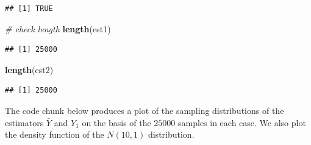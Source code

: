 \documentclass[]{book}
\newenvironment{Shaded}{\begin{snugshade}}{\end{snugshade}}
\newcommand{\KeywordTok}[1]{\textcolor[rgb]{0.13,0.29,0.53}{\textbf{#1}}}
\newcommand{\CommentTok}[1]{\textcolor[rgb]{0.56,0.35,0.01}{\textit{#1}}}
\newcommand{\NormalTok}[1]{#1}
\theoremstyle{definition}
\theoremstyle{definition}
\theoremstyle{definition}
\theoremstyle{remark}
\begin{document}
\begin{verbatim}
## [1] TRUE
\end{verbatim}

\begin{Shaded}
\begin{Highlighting}[]
\CommentTok{# check length}
\KeywordTok{length}\NormalTok{(est1)}
\end{Highlighting}
\end{Shaded}

\begin{verbatim}
## [1] 25000
\end{verbatim}

\begin{Shaded}
\begin{Highlighting}[]
\KeywordTok{length}\NormalTok{(est2)}
\end{Highlighting}
\end{Shaded}

\begin{verbatim}
## [1] 25000
\end{verbatim}

The code chunk below produces a plot of the sampling distributions of
the estimators \(\bar{Y}\) and \(Y_1\) on the basis of the \(25000\)
samples in each case. We also plot the density function of the
\(N(10,1)\) distribution.
\end{document}
